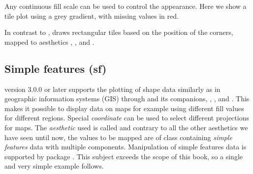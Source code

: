 \documentclass[krantz2]{krantz}\usepackage{knitr}%
\begin{document}
Any continuous fill scale can be used to control the appearance. Here we show a tile plot using a grey gradient, with missing values in red.

\begin{knitrout}\footnotesize
{}\color{fgcolor}\begin{kframe}
\begin{alltt}
    \hlopt{+}
  \hlstd{(} \hlstd{=} \hlstd{)} \hlopt{+}
  \hlstd{(} \hlstd{=} \hlstd{,}  \hlstd{=} \hlstd{,}  \hlstd{=} \hlstd{)}
\end{alltt}
\end{kframe}
\end{knitrout}

In contrast to ,  draws rectangular tiles based on the position of the corners, mapped to aesthetics , ,  and .


\subsection{Simple features (sf)}\label{sec:plot:sf}

\ggplot version 3.0.0 or later supports the plotting of shape data similarly as in geographic information systems (GIS) through  and its companions, , , and . This makes it possible to display data on maps for example using different fill values for different regions. Special \emph{coordinate}  can be used to select different projections for maps. The \emph{aesthetic} used is called  and contrary to all the other aesthetics we have seen until now, the values to be mapped are of class  containing \emph{simple features} data with multiple components. Manipulation of simple features data is supported by package . This subject exceeds the scope of this book, so a single and very simple example follows.
\end{document}
